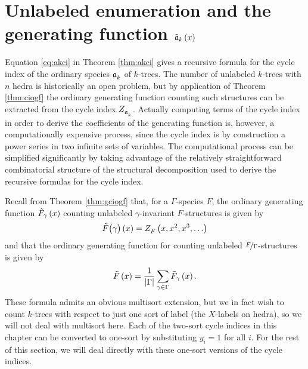 \documentclass[distribution,draft]{brandiss} %
\numberwithin{section}{chapter}
\numberwithin{figure}{chapter}
\begin{document}
\section{Unlabeled enumeration and the generating function $\tilde{\mathfrak{a}}_{k} \left( {x} \right)$}\label{ss:ktunlenum}
Equation \eqref{eq:akci} in Theorem \ref{thm:akci} gives a recursive formula for the cycle index of the ordinary species $\mathfrak{a}_{k}^{}$ of $k$-trees.
The number of unlabeled $k$-trees with $n$ hedra is historically an open problem, but by application of Theorem \ref{thm:ciogf} the ordinary generating function counting such structures can be extracted from the cycle index $ Z_{\mathfrak{a}_{k}^{}}^{} $.
Actually computing terms of the cycle index in order to derive the coefficients of the generating function is, however, a computationally expensive process, since the cycle index is by construction a power series in two infinite sets of variables.
The computational process can be simplified significantly by taking advantage of the relatively straightforward combinatorial structure of the structural decomposition used to derive the recursive formulas for the cycle index.

Recall from Theorem \ref{thm:gciogf} that, for a $\Gamma$-species $F$, the ordinary generating function $\tilde{F}_{\gamma} \left( {x} \right)$ counting unlabeled $\gamma$-invariant $F$-structures is given by
\[\tilde{F} \pbracs[big]{\gamma} \pbrac{x} = \civars{F}{x, x^2, x^3, \dots}\]
and that the ordinary generating function for counting unlabeled $\nicefrac{F}{\Gamma}$-structures is given by
\[\tilde{F} \left( {x} \right) = \frac{1}{\left\vert {\Gamma} \right\vert} \sum_{\gamma \in \Gamma} \tilde{F}_{\gamma} \left( {x} \right).\]
These formula admits an obvious multisort extension, but we in fact wish to count $k$-trees with respect to just one sort of label (the $X$-labels on hedra), so we will not deal with multisort here.
Each of the two-sort cycle indices in this chapter can be converted to one-sort by substituting $y_{i} = 1$ for all $i$.
For the rest of this section, we will deal directly with these one-sort versions of the cycle indices.
\end{document}
